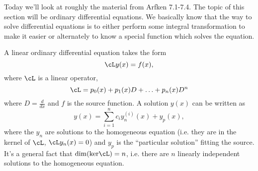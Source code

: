 Today we'll look at roughly the material from Arfken 7.1-7.4. The topic of this section will be ordinary differential equations. We basically know that the way to solve differential equations is to either perform some integral transformation to make it easier or alternately to know a special function which solves the equation.

A linear ordinary differential equation takes the form
\begin{equation}
    \cL y(x) = f(x),
\end{equation}
where $\cL$ is a linear operator,
\begin{equation}
    \cL = p_0(x) + p_1(x) D + \ldots + p_n(x) D^n
\end{equation}
where $D=\frac{d}{dx}$ and $f$ is the source function. A solution $y(x)$ can be written as
\begin{equation}
    y(x) =\sum_{i=1}^n c_i y_n^{(i)}(x) + y_p(x),
\end{equation}
where the $y_n$ are solutions to the homogeneous equation (i.e. they are in the kernel of $\cL$, $\cL y_n(x)=0$) and $y_p$ is the ``particular solution'' fitting the source. It's a general fact that $\dim(\text{ker}\cL)=n$, i.e. there are $n$ linearly independent solutions to the homogeneous equation.

